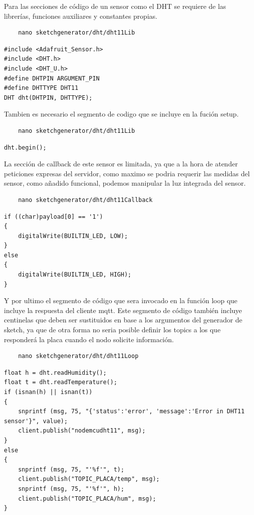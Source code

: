 Para las secciones de código de un sensor como el DHT se requiere de las librerías, funciones auxiliares y constantes propias.
\begin{verbatim}
    nano sketchgenerator/dht/dht11Lib
\end{verbatim}

\begin{verbatim}
#include <Adafruit_Sensor.h>
#include <DHT.h>
#include <DHT_U.h>
#define DHTPIN ARGUMENT_PIN
#define DHTTYPE DHT11
DHT dht(DHTPIN, DHTTYPE);
\end{verbatim}

Tambien es necesario el segmento de codigo que se incluye en la fución setup.
\begin{verbatim}
    nano sketchgenerator/dht/dht11Lib
\end{verbatim}

\begin{verbatim}
dht.begin();
\end{verbatim}

La sección de callback de este sensor es limitada, ya que a la hora de atender peticiones expresas del servidor, como maximo se podria requerir las medidas del sensor, como añadido funcional, podemos manipular la luz integrada del sensor.

\begin{verbatim}
    nano sketchgenerator/dht/dht11Callback
\end{verbatim}

\begin{verbatim}
if ((char)payload[0] == '1')
{
    digitalWrite(BUILTIN_LED, LOW);
}
else
{
    digitalWrite(BUILTIN_LED, HIGH);
}
\end{verbatim}

Y por ultimo el segmento de código que sera invocado en la función loop que incluye la respuesta del cliente \gls{mqtt}. Este segmento de código también incluye centinelas que deben ser sustituidos en base a los argumentos del generador de \gls{sketch}, ya que de otra forma no seria posible definir los topics a los que responderá la placa cuando el nodo solicite información.
\begin{verbatim}
    nano sketchgenerator/dht/dht11Loop
\end{verbatim}

\begin{verbatim}
float h = dht.readHumidity();
float t = dht.readTemperature();
if (isnan(h) || isnan(t))
{
    snprintf (msg, 75, "{'status':'error', 'message':'Error in DHT11 sensor'}", value);
    client.publish("nodemcudht11", msg);
}
else
{
    snprintf (msg, 75, "'%f'", t);
    client.publish("TOPIC_PLACA/temp", msg);
    snprintf (msg, 75, "'%f'", h);
    client.publish("TOPIC_PLACA/hum", msg);
}
\end{verbatim}

